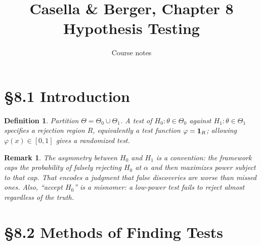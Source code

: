 \documentclass[11pt]{article}
\title{Casella \& Berger, Chapter 8\\[2pt]\large Hypothesis Testing}
\author{Course notes}\date{}
\newtheorem{definition}[theorem]{Definition}
\newtheorem{remark}[theorem]{Remark}
\begin{document}
\maketitle

\section{\S8.1 Introduction}
\begin{definition}
Partition $\Theta=\Theta_0\cup\Theta_1$. A test of $H_0:\theta\in\Theta_0$ against $H_1:\theta\in\Theta_1$ specifies a rejection region $R$, equivalently a test function $\varphi=\mathbf 1_R$; allowing $\varphi(x)\in[0,1]$ gives a randomized test.
\end{definition}
\begin{remark}
The asymmetry between $H_0$ and $H_1$ is a convention: the framework caps the probability of falsely rejecting $H_0$ at $\alpha$ and then maximizes power subject to that cap. That encodes a judgment that false discoveries are worse than missed ones. Also, ``accept $H_0$'' is a misnomer: a low-power test fails to reject almost regardless of the truth.
\end{remark}

\section{\S8.2 Methods of Finding Tests}
\end{document}

